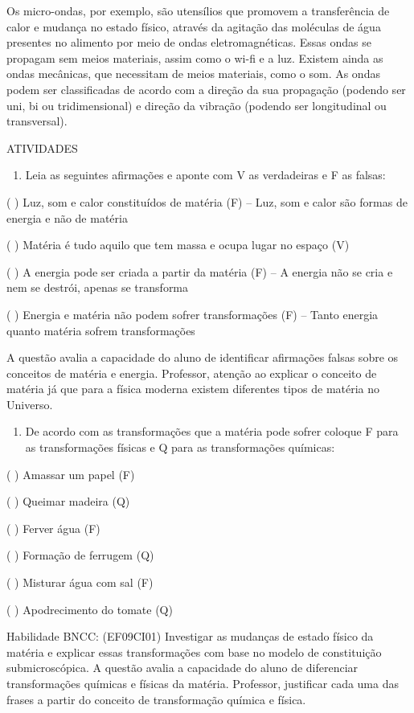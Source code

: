 Os micro-ondas, por exemplo, são utensílios que promovem a transferência
de calor e mudança no estado físico, através da agitação das moléculas
de água presentes no alimento por meio de ondas eletromagnéticas. Essas
ondas se propagam sem meios materiais, assim como o wi-fi e a luz.
Existem ainda as ondas mecânicas, que necessitam de meios materiais,
como o som. As ondas podem ser classificadas de acordo com a direção da
sua propagação (podendo ser uni, bi ou tridimensional) e direção da
vibração (podendo ser longitudinal ou transversal).

ATIVIDADES

\begin{enumerate}
\def\labelenumi{\arabic{enumi}.}
\item
  Leia as seguintes afirmações e aponte com V as verdadeiras e F as
  falsas:
\end{enumerate}

( ) Luz, som e calor constituídos de matéria (F) -- Luz, som e calor são
formas de energia e não de matéria

( ) Matéria é tudo aquilo que tem massa e ocupa lugar no espaço (V)

( ) A energia pode ser criada a partir da matéria (F) -- A energia não
se cria e nem se destrói, apenas se transforma

( ) Energia e matéria não podem sofrer transformações (F) -- Tanto
energia quanto matéria sofrem transformações

A questão avalia a capacidade do aluno de identificar afirmações falsas
sobre os conceitos de matéria e energia. Professor, atenção ao explicar
o conceito de matéria já que para a física moderna existem diferentes
tipos de matéria no Universo.

\begin{enumerate}
\def\labelenumi{\arabic{enumi}.}
\item
  De acordo com as transformações que a matéria pode sofrer coloque F
  para as transformações físicas e Q para as transformações químicas:
\end{enumerate}

( ) Amassar um papel (F)

( ) Queimar madeira (Q)

( ) Ferver água (F)

( ) Formação de ferrugem (Q)

( ) Misturar água com sal (F)

( ) Apodrecimento do tomate (Q)

Habilidade BNCC: (EF09CI01) Investigar as mudanças de estado físico da
matéria e explicar essas transformações com base no modelo de
constituição submicroscópica. A questão avalia a capacidade do aluno de
diferenciar transformações químicas e físicas da matéria. Professor,
justificar cada uma das frases a partir do conceito de transformação
química e física.

